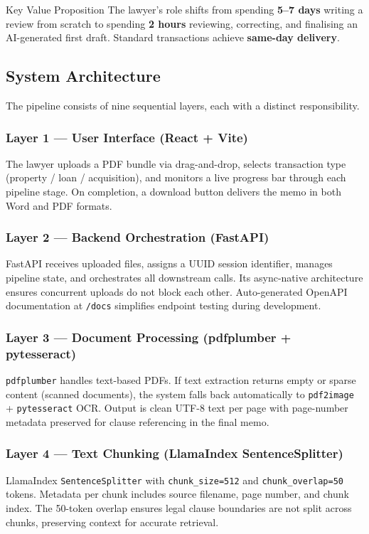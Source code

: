 \documentclass[12pt, a4paper]{article}
\begin{document}
\begin{successbox}{Key Value Proposition}
The lawyer's role shifts from spending \textbf{5--7 days} writing a review from
scratch to spending \textbf{2 hours} reviewing, correcting, and finalising an
AI-generated first draft. Standard transactions achieve \textbf{same-day delivery}.
\end{successbox}

\subsection{System Architecture}

The pipeline consists of nine sequential layers, each with a distinct
responsibility.

\subsubsection{Layer 1 --- User Interface (React + Vite)}
The lawyer uploads a PDF bundle via drag-and-drop, selects transaction type
(property / loan / acquisition), and monitors a live progress bar through each
pipeline stage. On completion, a download button delivers the memo in both Word
and PDF formats.

\subsubsection{Layer 2 --- Backend Orchestration (FastAPI)}
FastAPI receives uploaded files, assigns a UUID session identifier, manages
pipeline state, and orchestrates all downstream calls. Its async-native
architecture ensures concurrent uploads do not block each other. Auto-generated
OpenAPI documentation at \texttt{/docs} simplifies endpoint testing during
development.

\subsubsection{Layer 3 --- Document Processing (pdfplumber + pytesseract)}
\texttt{pdfplumber} handles text-based PDFs. If text extraction returns empty or
sparse content (scanned documents), the system falls back automatically to
\texttt{pdf2image} + \texttt{pytesseract} OCR. Output is clean UTF-8 text per
page with page-number metadata preserved for clause referencing in the final memo.

\subsubsection{Layer 4 --- Text Chunking (LlamaIndex SentenceSplitter)}
LlamaIndex \texttt{SentenceSplitter} with \texttt{chunk\_size=512} and
\texttt{chunk\_overlap=50} tokens. Metadata per chunk includes source filename,
page number, and chunk index. The 50-token overlap ensures legal clause boundaries
are not split across chunks, preserving context for accurate retrieval.
\end{document}
